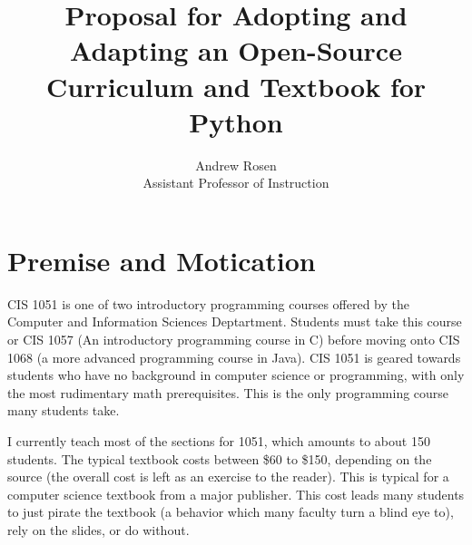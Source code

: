 \documentclass[]{article}
\title{Proposal for Adopting and Adapting an Open-Source Curriculum and Textbook for Python }
\author{Andrew Rosen\\ Assistant Professor of Instruction}
\begin{document}
%
%
%
%
%
%
%
%



\maketitle

\section{Premise and Motication}
CIS 1051 is one of two introductory programming courses offered by the Computer and Information Sciences Deptartment.  
Students must take this course or CIS 1057 (An introductory programming course in C) before moving onto CIS 1068 (a more advanced programming course in Java). CIS 1051 is geared towards students who have no background in computer science or programming, with only the most rudimentary math prerequisites.  This is the only programming course many students take.

I currently teach most of the sections for 1051, which amounts to about 150 students.  
The typical textbook costs between \$60 to \$150, depending on the source (the overall cost is left as an exercise to the reader).
This is typical for a computer science textbook from a major publisher.
This cost leads many students to just pirate the textbook (a behavior which many faculty turn a blind eye to), rely on the slides, or do without.
\end{document}
